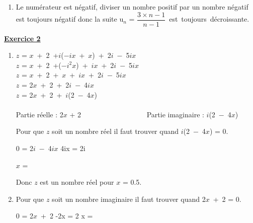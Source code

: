 \documentclass[12pt, a4paper, french]{article}
\begin{document}
\begin{Exo}
\begin{enumerate}
			Donc pour {n}~on~a~bien~u$_{n+1}$ $-$ u$_n$ =  \par 
			$n$ ne peut pas \^etre \'egal \`a moins de 3 car si $n$=1 :$(1-1)=0$, si $n$=2 :$(2-2)=0$. Une multiplication par $0$ fait toujours $0$. Le num\'erateur ne peut \^etre \'egal \`a $0$.\\ \\

		\item Le num\'erateur est n\'egatif, diviser un nombre positif par un nombre n\'egatif est toujours n\'egatif donc la suite u$_n$ = $\dfrac{3\times n-1}{n-1}$~est~toujours~d\'ecroissante.
	\end{enumerate}
\newpage
\item \underline{\textbf{Exercice 2}}
	\begin{enumerate}\par
		\item	$z$ = $x$~+~2~+$i$($-ix$~+~$x$)~+~2$i$~$-$~5$ix$ \\
				$z$ = $x$~+~2~+($-i^2x$)~+~$ix$~+~2$i$~$-$~5$ix$ \\
				$z$ = $x$~+~2~+~$x$~+~$ix$~+~2$i$~$-$~5$ix$ \\
				$z$ = 2$x$~+~2~+~2$i$~$-$~4$ix$ \\
				$z$ = 2$x$~+~2~+~$i$(2~$-$~4$x$) \\	\\
				Partie r\'eelle : 2$x$ + 2~~~~~~~~~~~~~~~~~~
				Partie imaginaire : $i$(2~$-$~4$x$)
			\begin{flushleft}
				Pour que $z$ soit un nombre r\'eel il faut trouver quand $i$(2~$-$~4$x$) = 0.\par
					0 = 2$i$~$-$~4$ix$
				\Leftrightarrow	4ix = 2i\par
		$x$ =  \Leftrightarrow {} \Leftrightarrow {} \Leftrightarrow {} \Leftrightarrow {} \Leftrightarrow {} 
			\end{flushleft}

				Donc $z$ est un nombre r\'eel pour $x$ = 0.5.
\item \begin{flushleft}
			Pour que $z$ soit un nombre imaginaire il faut trouver quand 2$x$~+~2 = 0.\par
				0 = 2$x$~+~2 \Leftrightarrow -2x = 2 \Leftrightarrow x =  \Leftrightarrow -1 
\end{flushleft}


\end{enumerate}
\end{Exo}
\end{document}
